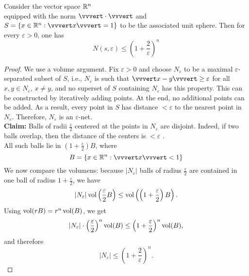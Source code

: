 \begin{lemma}
\begin{mdframed}
Consider the vector space $\mathbb{R}^n$  \\ equipped with the norm $\vvvert \cdot \vvvert$ and $S= \{x\in\R^n: \vvvert x \vvvert = 1\}$ to be the associated unit sphere. Then for every $\varepsilon >0$, one has
\begin{equation*}
N(s,\varepsilon) \leq \left( 1+\frac{2}{\varepsilon}\right)^n
\end{equation*}
\end{mdframed}
\begin{proof}
We use a volume argument. Fix $\varepsilon >0$ and choose $N_\varepsilon$ to be a maximal $\varepsilon$-separated subset of $S$, i.e., $N_\varepsilon$ is such that $\vvvert x-y \vvvert \geq \varepsilon$ for all $x,y \in N_\varepsilon$, $x\neq y$, and no superset of $S$ containing $N_\varepsilon$ has this property. This can be constructed by iteratively adding points. At the end, no additional points can be added. As a  result, every point in $S$ has distance $< \varepsilon$ to the nearest point in $N_\varepsilon$. Therefore, $N_\varepsilon$ is an $\varepsilon$-net. \\
\textbf{Claim:} Balls of radii $\frac{\varepsilon}{2}$ centered at the points in $N_\varepsilon$ are disjoint. Indeed, if two balls overlap, then the distance of the centers is $< \varepsilon$ \Lightning.\\
All such balls lie in $(1+\frac{\varepsilon}{2})B$, where
\begin{equation*}
B= \{x \in \R^n : \vvvert x \vvvert <1
\}
\end{equation*}
We now compare the volumens: because $|N_\varepsilon|$ balls of radius $\frac{\varepsilon}{2}$ are contained in one ball of radius $1+\frac{\varepsilon}{2}$, we have
\begin{equation*}
|N_\varepsilon| \operatorname{vol} \left(\frac{\varepsilon}{2}B\right ) \leq \operatorname{vol} \left(\left( 1+ \frac{\varepsilon}{2} \right)B\right).
\end{equation*}
Using $\operatorname{vol}(rB) = r^n \operatorname{vol}(B)$, we get
\begin{equation*}
|N_\varepsilon| \cdot \left( \frac{\varepsilon}{2} \right)^n \operatorname{vol}(B) \leq \left(1+\frac{\varepsilon}{2} \right)^n \operatorname{vol}(B),
\end{equation*}
and therefore 
\begin{equation*}
|N_\varepsilon| \leq \left( 1+\frac{2}{\varepsilon} \right)^n.
\end{equation*}
\end{proof}
\end{lemma}
